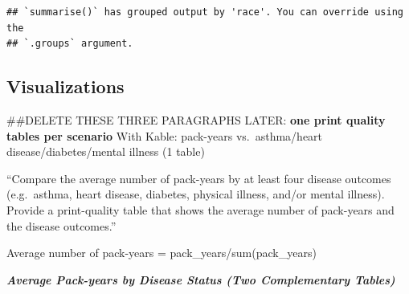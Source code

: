 \documentclass[
]{article}
\begin{document}
\begin{verbatim}
## `summarise()` has grouped output by 'race'. You can override using the
## `.groups` argument.
\end{verbatim}

\newpage

\hypertarget{visualizations}{%
\subsection{Visualizations}\label{visualizations}}

\#\#DELETE THESE THREE PARAGRAPHS LATER: \textbf{one print quality
tables per scenario} With Kable: pack-years vs.~asthma/heart
disease/diabetes/mental illness (1 table)

``Compare the average number of pack-years by at least four disease
outcomes (e.g.~asthma, heart disease, diabetes, physical illness, and/or
mental illness). Provide a print-quality table that shows the average
number of pack-years and the disease outcomes.''

Average number of pack-years = pack\_years/sum(pack\_years)

\emph{\textbf{Average Pack-years by Disease Status (Two Complementary
Tables)}}
\end{document}

